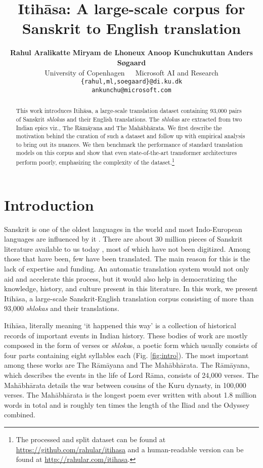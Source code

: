 \documentclass[11pt,a4paper]{article}
\title{Itih\={a}sa: A large-scale corpus for Sanskrit to English translation}
\author{\textbf{Rahul Aralikatte} \textbf{Miryam de Lhoneux} \textbf{Anoop Kunchukuttan} \textbf{Anders Søgaard} \\   
    University of Copenhagen~~~Microsoft AI and Research \\
    {\tt \{rahul,ml,soegaard\}@di.ku.dk} \\
    {\tt ankunchu@microsoft.com} \\
}
\newcommand\itihasa{Itih\={a}sa\xspace}
\newcommand\ramayana{The R\={a}m\={a}yana\xspace}
\newcommand\mahabharata{The Mah\={a}bh\={a}rata\xspace}
\begin{document}
\maketitle

\begin{abstract}
This work introduces \itihasa, a large-scale translation dataset containing 93,000 pairs of Sanskrit {\it shloka}s and their English translations. The {\it shloka}s are extracted from two Indian epics viz., \ramayana and \mahabharata. We first describe the motivation behind the curation of such a dataset and follow up with empirical analysis to bring out its nuances. We then benchmark the performance of standard translation models on this corpus and show that even state-of-the-art transformer architectures perform poorly, emphasizing the complexity of the dataset.\footnote{The processed and split dataset can be found at \url{https://github.com/rahular/itihasa} and a human-readable version can be found at \url{http://rahular.com/itihasa}.}
\end{abstract}

\section{Introduction}

Sanskrit is one of the oldest languages in the world and most Indo-European languages are influenced by it \cite{sanskit-influence}. There are about 30 million pieces of Sanskrit literature available to us today \cite{goyal-etal-30mil}, most of which have not been digitized. Among those that have been, few have been translated. The main reason for this is the lack of expertise and funding. An automatic translation system would not only aid and accelerate this process, but it would also help in democratizing the knowledge, history, and culture present in this literature. In this work, we present \itihasa, a large-scale Sanskrit-English translation corpus consisting of more than 93,000 {\it shlokas} and their translations.

\itihasa, literally meaning `it happened this way' is a collection of historical records of important events in Indian history. These bodies of work are mostly composed in the form of verses or {\it shloka}s, a poetic form which usually consists of four parts containing eight syllables each (Fig. \ref{fig:intro}). The most important among these works are \ramayana and \mahabharata. \ramayana, which describes the events in the life of Lord R\={a}ma, consists of 24,000 verses. \mahabharata details the war between cousins of the Kuru dynasty, in 100,000  verses. \mahabharata is the longest poem ever written with about 1.8 million words in total and is roughly ten times the length of the Iliad and the Odyssey combined.
\end{document}
